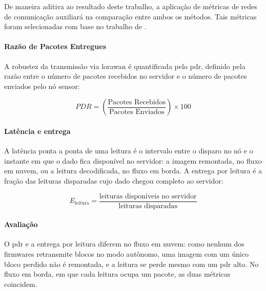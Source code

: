 De maneira aditiva ao resultado deste trabalho, 
a aplicação de métricas de redes de comunicação auxiliará na comparação entre ambos os métodos. 
Tais métricas foram selecionadas com base no trabalho de .

\paragraph{Razão de Pacotes Entregues}
A robustez da transmissão via \gls{lorawan} é quantificada pelo \gls{pdr},
definido pela razão entre o número de pacotes recebidos no servidor e o número
de pacotes enviados pelo nó sensor:

\begin{equation}
\label{eq:pdr}
PDR = \left( \frac{\text{Pacotes Recebidos}}{\text{Pacotes Enviados}} \right) \times 100
\end{equation}


\paragraph{Latência e entrega}
\label{subsubsec:metricas_latencia}
A latência ponta a ponta de uma leitura é o intervalo entre
o disparo no nó e o instante em que o dado fica disponível no servidor: a imagem remontada,
no fluxo em nuvem, ou a leitura decodificada, no fluxo em borda. A entrega por leitura é
a fração das leituras disparadas cujo dado chegou completo ao servidor:

\begin{equation}
    \label{eq:entrega_leitura}
    E_{\mathrm{leitura}} = \frac{\text{leituras disponíveis no servidor}}{\text{leituras disparadas}}
\end{equation}

\paragraph{Avaliação}

O \gls{pdr} e a entrega por leitura diferem no fluxo em nuvem: como nenhum dos firmwares
retransmite blocos no modo autônomo, uma imagem com um único bloco perdido não é remontada,
e a leitura se perde mesmo com um \gls{pdr} alto. No fluxo em borda, em que cada leitura
ocupa um pacote, as duas métricas coincidem.
